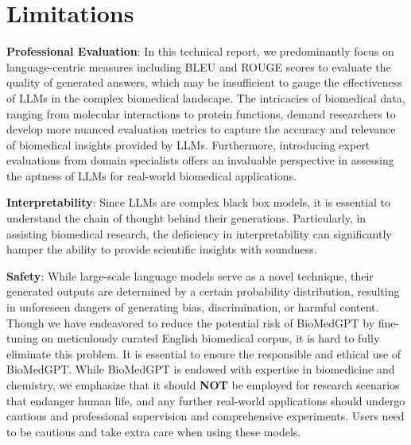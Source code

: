 \documentclass{article}
\begin{document}
\section{Limitations}
\textbf{Professional Evaluation}: In this technical report, we predominantly focus on language-centric measures including BLEU and ROUGE scores to evaluate the quality of generated answers, which may be insufficient to gauge the effectiveness of LLMs in the complex biomedical landscape. The intricacies of biomedical data, ranging from molecular interactions to protein functions, demand researchers to develop more nuanced evaluation metrics to capture the accuracy and relevance of biomedical insights provided by LLMs. Furthermore, introducing expert evaluations from domain specialists offers an invaluable perspective in assessing the aptness of LLMs for real-world biomedical applications.





\textbf{Interpretability}: Since LLMs are complex black box models, it is essential to understand the chain of thought behind their generations. Particularly, in assisting biomedical research, the deficiency in interpretability can significantly hamper the ability to provide scientific insights with soundness. 

\textbf{Safety}: While large-scale language models serve as a novel technique, their generated outputs are determined by a certain probability distribution, resulting in unforeseen dangers of generating bias, discrimination, or harmful content. Though we have endeavored to reduce the potential risk of BioMedGPT by fine-tuning on meticulously curated English biomedical corpus, it is hard to fully eliminate this problem. It is essential to ensure the responsible and ethical use of BioMedGPT. While BioMedGPT is endowed with expertise in biomedicine and chemistry, we emphasize that it should \textbf{NOT} be employed for research scenarios that endanger human life, and any further real-world applications should undergo cautious and professional supervision and comprehensive experiments. Users need to be cautious and take extra care when using these models. 
\end{document}
